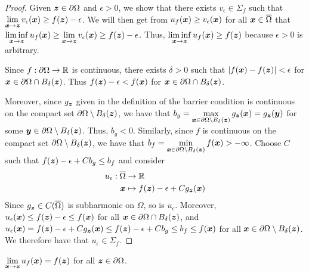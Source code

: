 \begin{proof}
Given ${\bm{z}} \in \partial \Omega$ and $\epsilon >0$, we show that
there exists $v_\epsilon \in \Sigma_f$ such that
$\displaystyle \lim_{{\bm{x}} \to {\bm{z}}} v_\epsilon({\bm{x}}) \geq
f({\bm{z}}) - \epsilon$.
We will then get from $u_f({\bm{x}}) \geq v_\epsilon({\bm{x}})$
for all ${\bm{x}} \in \overline{\Omega}$ that
$\displaystyle \liminf_{{\bm{x}}\to {\bm{z}}} u_f({\bm{x}}) 
\geq \lim_{{\bm{x}} \to {\bm{z}}} v_\epsilon({\bm{x}}) \geq f({\bm{z}}) -
\epsilon$.
Thus, $\displaystyle \liminf_{{\bm{x}}\to {\bm{z}}} u_f({\bm{x}}) \geq f({\bm{z}})$
because $\epsilon >0$ is arbitrary.

Since $f:\partial \Omega \to \mathbb{R}$ is continuous, there exists $\delta >0$
such that $|f({\bm{x}}) - f({\bm{z}})|<\epsilon$ for
${\bm{x}} \in \partial \Omega \cap B_\delta({\bm{z}})$.  Thus
$f({\bm{z}}) - \epsilon < f({\bm{x}})$ for
${\bm{x}} \in \partial \Omega \cap B_\delta({\bm{z}})$.

Moreover, since $g_{{\bm{z}}}$ given in the definition of the barrier
condition is continuous on the compact set
$\partial \Omega \setminus B_\delta({\bm{z}})$, we have that
$\displaystyle b_g = \max_{{\bm{x}} \in \partial \Omega \setminus B_\delta({\bm{z}})}
  g_{{\bm{z}}}({\bm{x}}) = g_{{\bm{z}}}({\bm{y}})$
for some ${\bm{y}} \in \partial \Omega \setminus B_\delta({\bm{z}})$.
Thus, $b_g<0$.  Similarly, since $f$ is continuous on the compact set
$\partial \Omega \setminus B_\delta({\bm{z}})$, we have that
$\displaystyle b_f = \min_{{\bm{x}} \in \partial \Omega \setminus B_\delta({\bm{z}})}
f({\bm{x}}) > -\infty$.
Choose $C$ such that $f({\bm{z}}) - \epsilon + Cb_g \leq b_f$ and
consider
\begin{align*}
  u_\epsilon : \overline{\Omega} & \to \mathbb{R} \\
  {\bm{x}} &\mapsto f({\bm{z}}) -\epsilon + C g_{{\bm{z}}}({\bm{x}})
\end{align*}
Since $\displaystyle g_{{\bm{z}}} \in C(\overline{\Omega})$
is subharmonic on $\Omega$, so is $u_\epsilon$.  Moreover,
$\displaystyle u_\epsilon({\bm{x}}) \leq f({\bm{z}}) - \epsilon \leq f({\bm{x}})$
for all ${\bm{x}} \in \partial \Omega \cap B_\delta({\bm{z}})$, and
$\displaystyle u_\epsilon({\bm{x}})
= f({\bm{z}}) -\epsilon + C g_{{\bm{z}}}({\bm{x}})
\leq f({\bm{z}}) -\epsilon + C b_g
\leq b_f \leq f({\bm{x}})$
for all ${\bm{x}} \in \partial \Omega \setminus B_\delta({\bm{z}})$.
We therefore have that $u_\epsilon \in \Sigma_f$.
\end{proof}

\begin{lemma} \label{PerronLem9}
$\displaystyle \lim_{{\bm{x}}\to {\bm{z}}} u_f({\bm{x}}) = f({\bm{z}})$
for all ${\bm{z}} \in \partial \Omega$.
\end{lemma}


